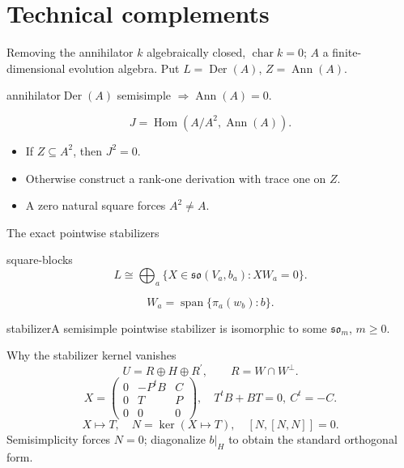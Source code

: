 \documentclass{beamer}
\begin{document}
\section{Technical complements}
\begin{frame}{Removing the annihilator}
{\small $k$ algebraically closed, $\operatorname{char}k=0$; $A$ a finite-dimensional evolution algebra. Put $L=\operatorname{Der}(A)$, $Z=\operatorname{Ann}(A)$.}
\begin{bookresult}{annihilator}$\operatorname{Der}(A)$ semisimple $\Longrightarrow\operatorname{Ann}(A)=0$.\end{bookresult}\[J=\operatorname{Hom}(A/A^2,\operatorname{Ann}(A)).\]\begin{itemize}\item If $Z\subseteq A^2$, then $J^2=0$.\item Otherwise construct a rank-one derivation with trace one on $Z$.\item A zero natural square forces $A^2\ne A$.\end{itemize}
\end{frame}
\begin{frame}{The exact pointwise stabilizers}
\begin{bookresult}{square-blocks}\[L\cong\bigoplus_a\{X\in\mathfrak{so}(V_a,b_a):XW_a=0\}.\]\end{bookresult}\[W_a=\operatorname{span}\{\pi_a(w_b):b\}.\]\begin{bookresult}{stabilizer}A semisimple pointwise stabilizer is isomorphic to some $\mathfrak{so}_m$, $m\ge0$.\end{bookresult}
\end{frame}
\begin{frame}{Why the stabilizer kernel vanishes}
\[U=R\oplus H\oplus R^{\prime},\qquad R=W\cap W^\perp.\]\[X=\begin{pmatrix}0&-P^tB&C\\0&T&P\\0&0&0\end{pmatrix},\quad T^tB+BT=0,\ C^t=-C.\]\[X\longmapsto T,\quad N=\ker(X\mapsto T),\quad[N,[N,N]]=0.\]Semisimplicity forces $N=0$; diagonalize $b|_H$ to obtain the standard orthogonal form.
\end{frame}
\end{document}
